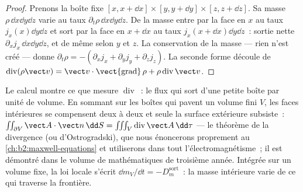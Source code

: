 \begin{proof}
Prenons la boîte fixe $[x, x + \dd x]\times[y, y + \dd y]\times[z, z + \dd z]$.
Sa masse $\rho\,\dd x\dd y\dd z$ varie au taux $\partial_t\rho\,\dd x\dd y
\dd z$. De la masse entre par la face en $x$ au taux $j_x(x)\dd y\dd z$
et sort par la face en $x + \dd x$ au taux $j_x(x + \dd x)\dd y\dd z$~:
sortie nette $\partial_xj_x\,\dd x\dd y\dd z$, et de même selon $y$ et $z$.
La conservation de la masse --- rien n'est créé --- donne $\partial_t\rho = -
(\partial_xj_x + \partial_yj_y + \partial_zj_z)$. La seconde forme découle de
$\operatorname{div}(\rho\vect v) = \vect v\cdot\operatorname{\vect{grad}}\rho +
\rho\operatorname{div}\vect v$.
\end{proof}

\begin{remark}\label{rem:b2:fluid-kinematics:divergence}
Le calcul montre ce que mesure $\operatorname{div}$~: le flux qui sort
d'une petite boîte par unité de volume. En sommant sur les boîtes qui pavent un
volume fini $V$, les faces intérieures se compensent deux à deux et seule la
surface extérieure subsiste~: $\iint_{\partial V}\vect A\cdot\vect n\,\dd S = \iiint_V
\operatorname{div}\vect A\,\dd\tau$ --- le théorème de la divergence (ou
d'Ostrogradski), que nous énoncerons proprement au \cref{ch:b2:maxwell-equations}
et utiliserons dans tout l'électromagnétisme~; il est démontré dans le volume de
mathématiques de troisième année. Intégrée sur un volume fixe, la loi locale s'écrit
$\dd m_V/\dd t = -D_m^{\text{sort}}$~: la masse intérieure varie de ce qui
traverse la frontière.
\end{remark}

